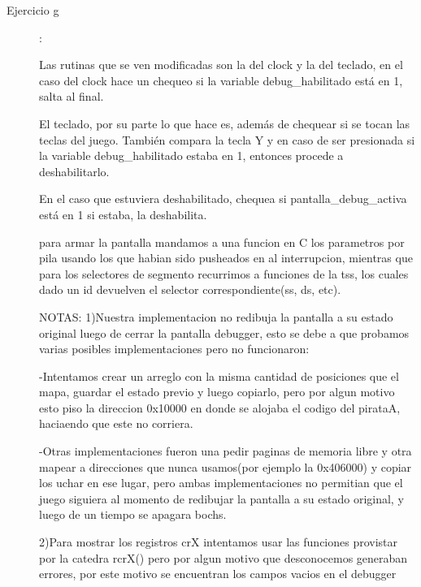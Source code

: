 \documentclass[a4paper]{article}
\begin{document}
\begin{description}
  
  \item[Ejercicio g] :

  Las rutinas que se ven modificadas son la del clock y la del teclado, en el caso del clock hace un chequeo si la variable debug_habilitado está en 1, salta al final.
  
  El teclado, por su parte lo que hace es, además de chequear si se tocan las teclas del juego. También compara la tecla Y y en caso de ser presionada si la variable debug_habilitado estaba en 1, entonces procede a deshabilitarlo.
  
  En el caso que estuviera deshabilitado, chequea si pantalla_debug_activa está en 1 si estaba, la deshabilita. 
  
  para armar la pantalla mandamos a una funcion en C los parametros por pila usando los que habian sido pusheados en al interrupcion, mientras que para los selectores de segmento recurrimos a funciones de la tss, los cuales dado un id devuelven el selector correspondiente(ss, ds, etc).

NOTAS:
1)Nuestra implementacion no redibuja la pantalla a su estado original luego de cerrar la pantalla debugger, esto se debe a que probamos varias posibles implementaciones pero no funcionaron:

-Intentamos crear un arreglo con la misma cantidad de posiciones que el mapa, guardar el estado previo y luego copiarlo, pero por algun motivo esto piso la direccion 0x10000 en donde se alojaba el codigo del pirataA, haciaendo que este no corriera.

-Otras implementaciones fueron una pedir paginas de memoria libre y otra mapear a direcciones que nunca usamos(por ejemplo la 0x406000) y copiar los uchar en ese lugar, pero ambas implementaciones no permitian que el juego siguiera al momento de redibujar la pantalla a su estado original, y luego de un tiempo se apagara bochs.
  
2)Para mostrar los registros crX intentamos usar las funciones provistar por la catedra rcrX() pero por algun motivo que desconocemos generaban errores, por este motivo se encuentran los campos vacios en el debugger
\end{description}
\end{document}
